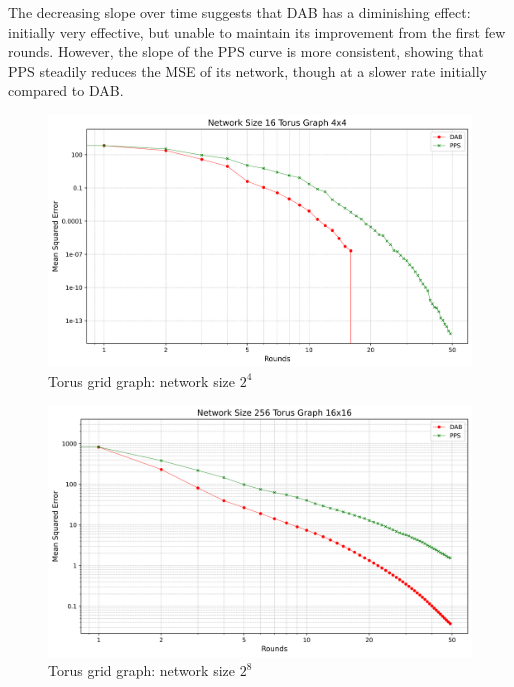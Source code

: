 The decreasing slope over time suggests that DAB has a diminishing effect: initially very effective, but unable to maintain its improvement from the first few rounds. However, the slope of the PPS curve is more consistent, showing that PPS steadily reduces the MSE of its network, though at a slower rate initially compared to DAB.\\
\begin{figure}[H]
    \centering
    \includegraphics[scale=0.5]{figures/torusGridGraphSimulations/DAB_vs_PPS_TG_r50_n16.png}
    \caption{Torus grid graph: network size $2^{4}$}
    \label{fig:16torusGraph}
\end{figure}

\begin{figure}[H]
    \centering
    \includegraphics[scale=0.5]{figures/torusGridGraphSimulations/DAB_vs_PPS_TG_r50_n256.png}
    \caption{Torus grid graph: network size $2^{8}$}
    \label{fig:256torusGraph}
\end{figure}

